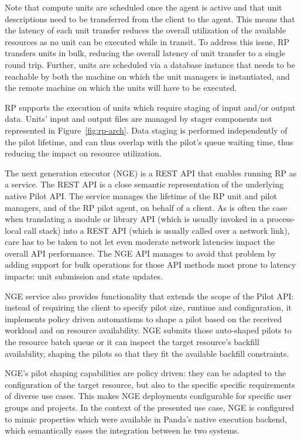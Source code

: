 \documentclass{webofc}
\begin{document}
Note that compute units are scheduled once the agent is active and that unit
descriptions need to be transferred from the client to the agent. This means
that the latency of each unit transfer reduces the overall utilization of the
available resources as no unit can be executed while in transit. To address
this issue, RP transfers units in bulk, reducing the overall latency of unit
transfer to a single round trip. Further, units are scheduled via a database
instance that needs to be reachable by both the machine on which the unit
managers is instantiated, and the remote machine on which the units will have
to be executed.
	
RP supports the execution of units which require staging of input and/or
output data. Units’ input and output files are managed by stager components
not represented in Figure~\ref{fig:rp-arch}. Data staging is performed
independently of the pilot lifetime, and can thus overlap with the pilot's
queue waiting time, thus reducing the impact on resource utilization.
	
The next generation executor (NGE) is a REST API that enables running RP as a
service. The REST API is a close semantic representation of the underlying
native Pilot API.  The service manages the lifetime of the RP unit and pilot
managers, and of the RP pilot agent, on behalf of a client. As is often the
case when translating a module or library API (which is usually invoked in a
process-local call stack) into a REST API (which is usually called over a
network link), care has to be taken to not let even moderate network
latencies impact the overall API performance.  The NGE API manages to avoid
that problem by adding support for bulk operations for those API methods most
prone to latency impacts: unit submission and state updates.
	
NGE service also provides functionality that extends the scope of the Pilot
API: instead of requiring the client to specify pilot size, runtime and
configuration, it implements policy driven automatisms to shape a pilot based
on the received workload and on resource availability. NGE submits those
auto-shaped pilots to the resource batch queue or it can inspect the target
resource's backfill availability, shaping the pilots so that they fit the
available backfill constraints.
	
NGE's pilot shaping capabilities are policy driven: they can be adapted to
the configuration of the target resource, but also to the specific specific
requirements of diverse use cases. This makes NGE deployments configurable
for specific user groups and projects. In the context of the presented use
case, NGE is configured to mimic properties which were available in Panda's
native execution backend, which semantically eases the integration between
he two systems.
\end{document}
